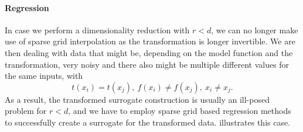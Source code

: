 \documentclass[
  a4paper,  %
  twoside,  %
  bibliography=totoc,
  headsepline,
  cleardoublepage=empty,
  parskip=half,
  draft=false
]{scrbook}
\begin{document}
\paragraph{Regression}
In case we perform a dimensionality reduction with $r < d$, we can no longer make use of sparse grid interpolation as the transformation is longer invertible.
We are then dealing with data that might be, depending on the model function and the transformation, very noisy and there also might be multiple different values for the same inputs, with
\begin{equation}
t(x_i)=t(x_j), ~ f(x_i) \neq f(x_j), ~ x_i \neq x_j.
\end{equation}
As a result, the transformed surrogate construction is usually an ill-posed problem for $r < d$, and we have to employ sparse grid based regression methods to successfully create a surrogate for the transformed data.
 illustrates this case.
\end{document}
